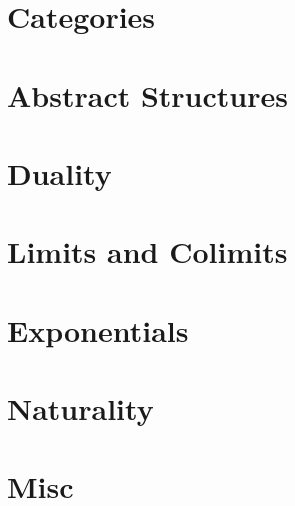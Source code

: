 \documentclass{article}
\theoremstyle{definition}
\theoremstyle{remark}
\begin{document}
\section{Categories}


\section{Abstract Structures}



\section{Duality}




\section{Limits and Colimits}





\section{Exponentials}



\section{Naturality}




\section{Misc}

\end{document}
